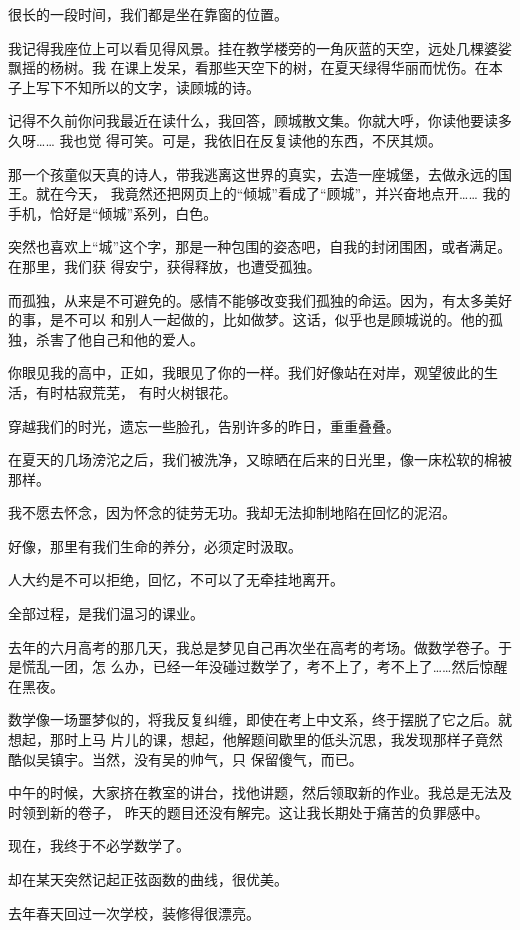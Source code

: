 		很长的一段时间，我们都是坐在靠窗的位置。

		我记得我座位上可以看见得风景。挂在教学楼旁的一角灰蓝的天空，远处几棵婆娑飘摇的杨树。我
	在课上发呆，看那些天空下的树，在夏天绿得华丽而忧伤。在本子上写下不知所以的文字，读顾城的诗。

		记得不久前你问我最近在读什么，我回答，顾城散文集。你就大呼，你读他要读多久呀…… 我也觉
	得可笑。可是，我依旧在反复读他的东西，不厌其烦。

		那一个孩童似天真的诗人，带我逃离这世界的真实，去造一座城堡，去做永远的国王。就在今天，
	我竟然还把网页上的“倾城”看成了“顾城”，并兴奋地点开…… 我的手机，恰好是“倾城”系列，白色。

		突然也喜欢上“城”这个字，那是一种包围的姿态吧，自我的封闭围困，或者满足。在那里，我们获
	得安宁，获得释放，也遭受孤独。


		而孤独，从来是不可避免的。感情不能够改变我们孤独的命运。因为，有太多美好的事，是不可以
	和别人一起做的，比如做梦。这话，似乎也是顾城说的。他的孤独，杀害了他自己和他的爱人。


		你眼见我的高中，正如，我眼见了你的一样。我们好像站在对岸，观望彼此的生活，有时枯寂荒芜，
	有时火树银花。

		穿越我们的时光，遗忘一些脸孔，告别许多的昨日，重重叠叠。

		在夏天的几场滂沱之后，我们被洗净，又晾晒在后来的日光里，像一床松软的棉被那样。

		我不愿去怀念，因为怀念的徒劳无功。我却无法抑制地陷在回忆的泥沼。

		好像，那里有我们生命的养分，必须定时汲取。

		人大约是不可以拒绝，回忆，不可以了无牵挂地离开。

		全部过程，是我们温习的课业。


		去年的六月高考的那几天，我总是梦见自己再次坐在高考的考场。做数学卷子。于是慌乱一团，怎
	么办，已经一年没碰过数学了，考不上了，考不上了……然后惊醒在黑夜。

		数学像一场噩梦似的，将我反复纠缠，即使在考上中文系，终于摆脱了它之后。就想起，那时上马
	片儿的课，想起，他解题间歇里的低头沉思，我发现那样子竟然酷似吴镇宇。当然，没有吴的帅气，只
	保留傻气，而已。

		中午的时候，大家挤在教室的讲台，找他讲题，然后领取新的作业。我总是无法及时领到新的卷子，
	昨天的题目还没有解完。这让我长期处于痛苦的负罪感中。

		现在，我终于不必学数学了。

		却在某天突然记起正弦函数的曲线，很优美。

		去年春天回过一次学校，装修得很漂亮。

